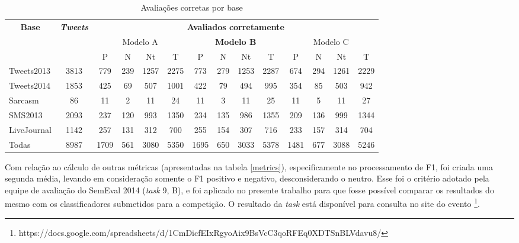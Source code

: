\documentclass[12pt]{article}
\begin{document}
\begin{table}[H]
\centering
\begin{adjustwidth}{-1.5cm}{}
\begin{tabular}{lccccccccccccc}
\multicolumn{1}{c}{\textbf{Base}} & \textit{\textbf{Tweets}} & \multicolumn{12}{c}{\textbf{Avaliados corretamente}} \\
 & \multicolumn{1}{l}{} & \multicolumn{4}{c}{Modelo A} & \multicolumn{4}{c}{\textbf{Modelo B}} & \multicolumn{4}{c}{Modelo C} \\
 & \multicolumn{1}{l}{} & \multicolumn{1}{c|}{P} & \multicolumn{1}{c|}{N} & \multicolumn{1}{c|}{Nt} & T & \multicolumn{1}{c|}{P} & \multicolumn{1}{c|}{N} & \multicolumn{1}{c|}{Nt} & T & \multicolumn{1}{c|}{P} & \multicolumn{1}{c|}{N} & \multicolumn{1}{c|}{Nt} & T \\
Tweets2013 & 3813 & 779 & 239 & 1257 & 2275 & 773 & 279 & 1253 & 2287 & 674 & 294 & 1261 & 2229 \\ \hline
Tweets2014 & 1853 & 425 & 69 & 507 & 1001 & 422 & 79 & 494 & 995 & 354 & 85 & 503 & 942 \\ \hline
Sarcasm & 86 & 11 & 2 & 11 & 24 & 11 & 3 & 11 & 25 & 11 & 5 & 11 & 27 \\ \hline
SMS2013 & 2093 & 237 & 120 & 993 & 1350 & 234 & 135 & 986 & 1355 & 209 & 136 & 999 & 1344 \\ \hline
LiveJournal & 1142 & 257 & 131 & 312 & 700 & 255 & 154 & 307 & 716 & 233 & 157 & 314 & 704 \\ \hline
Todas & 8987 & 1709 & 561 & 3080 & 5350 & 1695 & 650 & 3033 & 5378 & 1481 & 677 & 3088 & 5246\\ \hline
\end{tabular}
\caption{Avaliações corretas por base}
\label{correctEvaluations}
\end{adjustwidth}
\end{table}


Com relação ao cálculo de outras métricas (apresentadas na tabela \ref{metrics}), especificamente no processamento de F1, foi criada uma segunda média, levando em consideração somente o F1 positivo e negativo, desconsiderando o neutro. Esse foi o critério adotado pela equipe de avaliação do SemEval 2014 (\emph{task} 9, B), e foi aplicado no presente trabalho para que fosse possível comparar os resultados do mesmo com os classificadores submetidos para a competição. O resultado da \emph{task} está disponível para consulta no site do evento \footnote{https://docs.google.com/spreadsheets/d/1CmDicfEIxRgyoAix9BsVcC3qoRFEq0XDTSnBLVdavu8/}.
\end{document}

